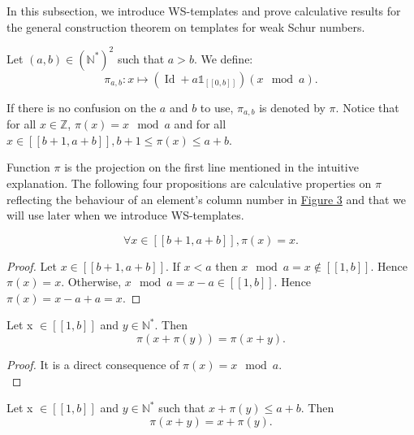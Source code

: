 \documentclass[final,onefignum,onetabnum]{siamart190516}
\begin{document}
In this subsection, we introduce WS-templates and prove calculative results for the general construction
theorem on templates for weak Schur numbers.

\begin{definition}
Let \((a,b) \in (\mathbb{N}^*)^2\) such that \(a>b\). We define:
\[ \pi_{a,b}:x \longmapsto (\operatorname{Id}+a\mathds{1}_{ [\![0,b]\!]})(x \mod a).\]
\end{definition}

\begin{sloppypar}
If there is no confusion on the \(a\) and \(b\) to use, \(\pi_{a, b}\) is denoted by \(\pi\). Notice that for all \(x \in \mathbb{Z}\), 
\({\pi(x) = x \mod a}\) and for all \(x \in [\![b + 1, a + b]\!], b + 1 \leqslant \pi(x) \leqslant a + b\).
\end{sloppypar}

\begin{sloppypar}
Function \(\pi\) is the projection on the first line mentioned in the intuitive explanation. The following four propositions are
calculative properties on \(\pi\) reflecting the behaviour of an element's column number in \hyperref[SchemaWS]{Figure 3} and
that we will use later when we introduce WS-templates.
\end{sloppypar}

\begin{proposition}
\label{prop1}
\[
\forall x \in [\![b + 1, a + b]\!], \pi(x) = x.
\]
\end{proposition}

\begin{proof}
\begin{sloppypar}
Let \(x \in [\![b + 1, a + b]\!]\). If \(x < a\) then \(x \mod a = x \notin [\![1, b]\!]\). Hence \(\pi(x) = x\).
Otherwise, \({x \mod a = x - a \in [\![1, b]\!]}\). Hence \({\pi(x) = x - a + a = x}\).
\end{sloppypar}
\end{proof}

\begin{proposition}
\label{prop2}
Let x \(\in [\![1,b]\!]\) and \(y \in \mathbb{N}^*\). Then
\[
\pi(x+\pi(y)) = \pi(x+y).
\]
\end{proposition}

\begin{proof}
It is a direct consequence of \(\pi(x) = x \mod a\). \\
\end{proof}

\begin{proposition}
\label{prop3}
Let x \(\in [\![1,b]\!]\) and \(y \in \mathbb{N}^*\) such that \(x+\pi(y) \leqslant a+b\). Then
\[
\pi(x+y)=x+\pi(y).
\]
\end{proposition}
\end{document}
